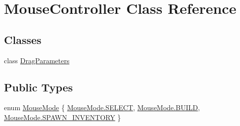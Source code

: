 \hypertarget{class_mouse_controller}{}\section{Mouse\+Controller Class Reference}
\label{class_mouse_controller}
\subsection*{Classes}
\begin{DoxyCompactItemize}
\item 
class \hyperlink{class_mouse_controller_1_1_drag_parameters}{Drag\+Parameters}
\end{DoxyCompactItemize}
\subsection*{Public Types}
\begin{DoxyCompactItemize}
\item 
enum \hyperlink{class_mouse_controller_aa9b016ba73cc945841e3fae192330a51}{Mouse\+Mode} \{ \hyperlink{class_mouse_controller_aa9b016ba73cc945841e3fae192330a51a63225f19fccb18e7c709f1fa11bc738e}{Mouse\+Mode.\+S\+E\+L\+E\+CT}, 
\hyperlink{class_mouse_controller_aa9b016ba73cc945841e3fae192330a51a96239ee297e0a92ac6ff96a6bc434ef0}{Mouse\+Mode.\+B\+U\+I\+LD}, 
\hyperlink{class_mouse_controller_aa9b016ba73cc945841e3fae192330a51a03e4597cfea6442c61ec6c6a3f6eb59c}{Mouse\+Mode.\+S\+P\+A\+W\+N\+\_\+\+I\+N\+V\+E\+N\+T\+O\+RY}
 \}
\end{DoxyCompactItemize}
